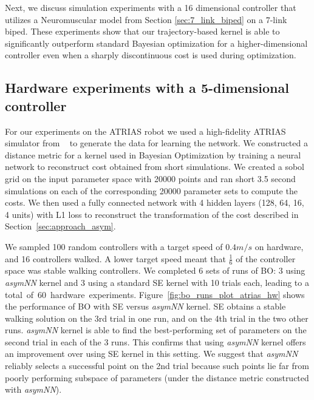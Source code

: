 Next, we discuss simulation experiments with a 16 dimensional controller that utilizes a Neuromuscular model from Section \ref{sec:7_link_biped} on a 7-link biped. These experiments show that our trajectory-based kernel is able to significantly outperform standard Bayesian optimization for a higher-dimensional controller even when a sharply discontinuous cost is used during optimization.

\subsection{Hardware experiments with a 5-dimensional controller}
\label{experiments_atrias}

For our experiments on the ATRIAS robot we used a high-fidelity ATRIAS simulator from ~\cite{martin2015robust} to generate the data for learning the network. 
We constructed a distance metric for a kernel used in Bayesian Optimization by training a neural network to reconstruct cost obtained from short simulations. We created a sobol grid on the input parameter space with 20000 points and ran short 3.5 second simulations on each of the corresponding 20000 parameter sets to compute the costs. We then used a fully connected network with 4 hidden layers (128, 64, 16, 4 units) with L1 loss to reconstruct the transformation of the cost described in Section~\ref{sec:approach_asym}.


We sampled 100 random controllers with a target speed of $0.4m/s$ on hardware, and 16 controllers walked. A lower target speed meant that $\frac{1}{6}$ of the controller space was stable walking controllers. We completed 6 sets of runs of BO: 3 using \textit{asymNN} kernel and 3 using a standard SE kernel with 10 trials each, leading to a \mbox{total of 60 hardware experiments}. Figure~\ref{fig:bo_runs_plot_atrias_hw} shows the performance of BO with SE versus \textit{asymNN} kernel. SE obtains a stable walking solution on the 3rd trial in one run, and on the 4th trial in the two other runs. \textit{asymNN} kernel is able to find the best-performing set of parameters on the second trial in each of the 3 runs. This confirms that using \textit{asymNN} kernel offers an improvement over using SE kernel in this setting. We suggest that \textit{asymNN} reliably selects a successful point on the 2nd trial  because such points lie far from  poorly performing subspace of parameters (under the distance metric constructed with \textit{asymNN}). 


